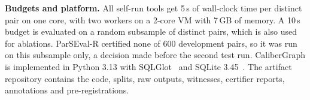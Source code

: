 \textbf{Budgets and platform.} All self-run tools get 5\,s of wall-clock time per distinct pair on one core, with two workers on a 2-core VM with 7\,GB of memory. A 10\,s budget is evaluated on a random subsample of  distinct pairs, which is also used for ablations. ParSEval-R certified none of 600 development pairs, so it was run on this subsample only, a decision made before the second test run. CaliberGraph is implemented in Python 3.13 with SQLGlot~\cite{sqlglot} and SQLite 3.45~\cite{sqlite}. The artifact repository contains the code, splits, raw outputs, witnesses, certifier reports, annotations and pre-registrations.
